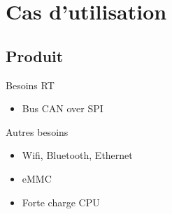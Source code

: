 \section{Cas d'utilisation}
\subsection{Produit}
\begin{frame}
	\begin{block}{Besoins RT}
		\begin{itemize}
			\item Bus CAN over SPI
		\end{itemize}
	\end{block}
	\begin{block}{Autres besoins}
		\begin{itemize}
			\item Wifi, Bluetooth, Ethernet
			\item eMMC
			\item Forte charge CPU
		\end{itemize}
	\end{block}
\end{frame}

